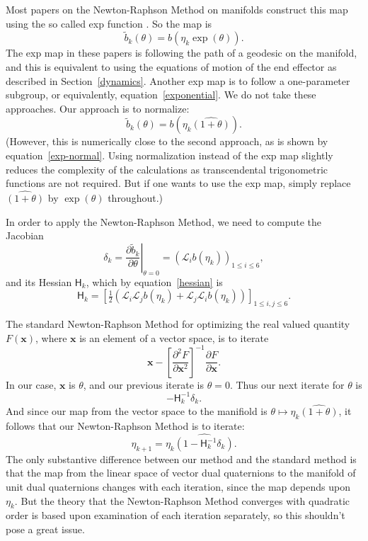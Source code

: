 \documentclass[reqno,12pt]{amsart}
\newcommand{\liederiv}{\mathcal L}
\begin{document}
Most papers on the Newton-Raphson Method on manifolds construct this map using the so called exp function \cite{dedieu-et-al,fernandes-et-al,ferreira-svaiter}.  So the map is
\begin{equation}
\tilde b_k(\theta) = b(\eta_k \exp(\theta)).
\end{equation}
The exp map in these papers is following the path of a geodesic on the manifold, and this is equivalent to using the equations of motion of the end effector as described in Section~\ref{dynamics}.  Another exp map is to follow a one-parameter subgroup, or equivalently, equation~\eqref{exponential}.  We do not take these approaches.  Our approach is to normalize:
\begin{equation}
\tilde b_k(\theta) = b(\eta_k  \widehat{(1 + \theta)}).
\end{equation}
(However, this is numerically close to the second approach, as is shown by equation~\eqref{exp-normal}.  Using normalization instead of the exp map slightly reduces the complexity of the calculations as transcendental trigonometric functions are not required.  But if one wants to use the exp map, simply replace $\widehat{(1+\theta)}$ by $\exp(\theta)$ throughout.)

In order to apply the Newton-Raphson Method, we need to compute the Jacobian
\begin{equation}
\label{jacobian}
\delta_k = \left.\frac{\partial\tilde b_k}{\partial\theta} \right|_{\theta = 0} = (\liederiv_i b(\eta_k))_{1 \le i \le 6},
\end{equation}
and its Hessian $\mathsf H_k$, which by equation~\eqref{hessian} is
\begin{equation}
\mathsf H_k
= \left[\tfrac12 (\liederiv_i \liederiv_j b(\eta_k) + \liederiv_j \liederiv_i b(\eta_k)) \right]_{1\le i,j\le 6}.
\end{equation}

The standard Newton-Raphson Method for optimizing the real valued quantity $F(\bm x)$, where $\bm x$ is an element of a vector space, is to iterate
\begin{equation}
\bm x - \left[\frac{\partial^2 F}{\partial \bm x^2}\right]^{-1} \frac{\partial F}{\partial \bm x} .
\end{equation}
In our case, $\bm x$ is $\theta$, and our previous iterate is $\theta = 0$.  Thus our next iterate for $\theta$ is
\begin{equation}
 - \mathsf H_k^{-1} \delta_k .
\end{equation}
And since our map from the vector space to the manifiold is $\theta \mapsto \eta_k \widehat{(1+\theta)}$, it follows that our Newton-Raphson Method is to iterate:
\begin{equation}
\eta_{k+1} = \eta_k \widehat{(1 - \mathsf H_k^{-1} \delta_k)} .
\end{equation}
The only substantive difference between our method and the standard method is that the map from the linear space of vector dual quaternions to the manifold of unit dual quaternions changes with each iteration, since the map depends upon $\eta_k$.  But the theory that the Newton-Raphson Method converges with quadratic order is based upon examination of each iteration separately, so this shouldn't pose a great issue.
\end{document}
